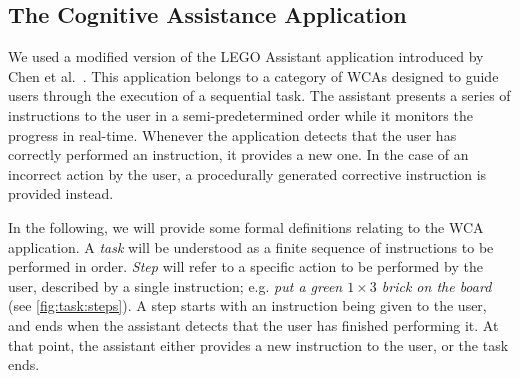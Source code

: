 \subsection{The Cognitive Assistance Application}

We used a modified version of the LEGO Assistant application introduced by Chen et al.~\cite{Chen:EarlyImplementation}.
This application belongs to a category of WCAs designed to guide users through the execution of a sequential task.
The assistant presents a series of instructions to the user in a semi-predetermined order while it monitors the progress in real-time.
Whenever the application detects that the user has correctly performed an instruction, it provides a new one.
In the case of an incorrect action by the user, a procedurally generated corrective instruction is provided instead.

In the following, we will provide some formal definitions relating to the WCA application.
A \emph{task} will be understood as a finite sequence of instructions to be performed in order.
\emph{Step} will refer to a specific action to be performed by the user, described by a single instruction; e.g. \emph{put a green \(1 \times 3\) brick on the board} (see \cref{fig:task:steps}).
A step starts with an instruction being given to the user, and ends when the assistant detects that the user has finished performing it.
At that point, the assistant either provides a new instruction to the user, or the task ends.

